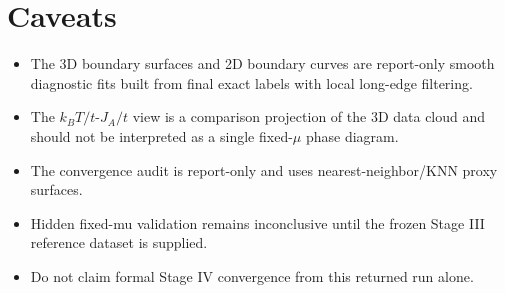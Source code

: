 \documentclass[11pt]{article}
\begin{document}
\section*{Caveats}
\begin{itemize}
\item The 3D boundary surfaces and 2D boundary curves are report-only smooth diagnostic fits built from final exact labels with local long-edge filtering.
\item The \(k_B T/t\)-\(J_A/t\) view is a comparison projection of the 3D data cloud and should not be interpreted as a single fixed-\(\mu\) phase diagram.
\item The convergence audit is report-only and uses nearest-neighbor/KNN proxy surfaces.
\item Hidden fixed-mu validation remains inconclusive until the frozen Stage III reference dataset is supplied.
\item Do not claim formal Stage IV convergence from this returned run alone.
\end{itemize}
\end{document}
